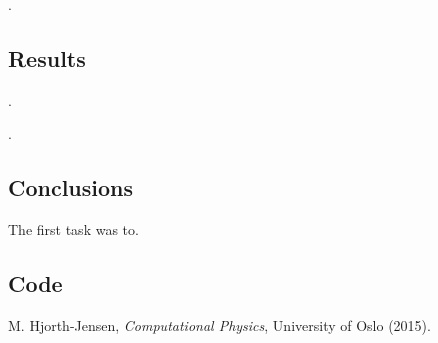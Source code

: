 \documentclass[11pt]{article}
\begin{document}
    . 

\subsection{Results}

    .



    .


\subsection{Conclusions}

    The first task was to.

\subsection{Code}


\begin{thebibliography}{1}

    M. Hjorth-Jensen, {\em Computational Physics}, University of Oslo (2015). 

\end{thebibliography}
\end{document}
